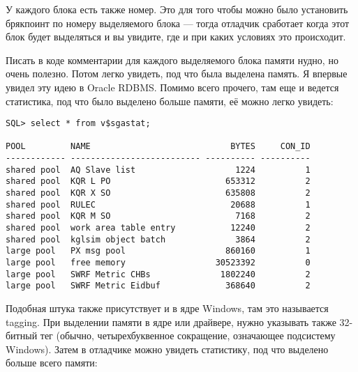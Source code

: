 У каждого блока есть также номер.
Это для того чтобы можно было установить брякпоинт по номеру выделяемого блока --- 
тогда отладчик сработает когда этот блок будет выделяться и вы увидите, где и при каких условиях это происходит.

Писать в коде комментарии для каждого выделяемого блока памяти нудно, но очень полезно. Потом легко увидеть,
под что была выделена память. Я впервые увидел эту идею в Oracle RDBMS. Помимо всего прочего, там еще и ведется
статистика, под что было выделено больше памяти, её можно легко увидеть:

\begin{lstlisting}
SQL> select * from v$sgastat;

POOL         NAME                            BYTES     CON_ID
------------ -------------------------- ---------- ----------
shared pool  AQ Slave list                    1224          1
shared pool  KQR L PO                       653312          2
shared pool  KQR X SO                       635808          2
shared pool  RULEC                           20688          1
shared pool  KQR M SO                         7168          2
shared pool  work area table entry           12240          2
shared pool  kglsim object batch              3864          2
large pool   PX msg pool                    860160          1
large pool   free memory                  30523392          0
large pool   SWRF Metric CHBs              1802240          2
large pool   SWRF Metric Eidbuf             368640          2
\end{lstlisting}

Подобная штука также присутствует и в ядре Windows, там это называется tagging. При выделении памяти
в ядре или драйвере, нужно указывать также 32-битный тег (обычно, четырехбуквенное сокращение, означающее
подсистему Windows). 
Затем в отладчике можно увидеть статистику, под что выделено больше всего памяти:

